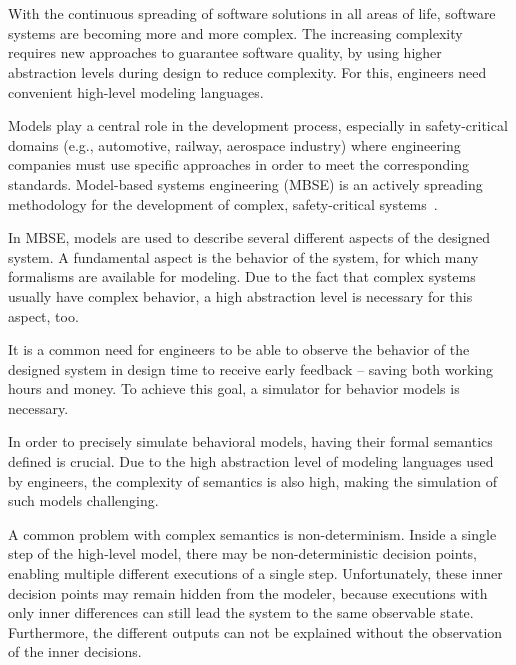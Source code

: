\chapter{\bevezetes}

With the continuous spreading of software solutions in all areas of life, software systems are becoming more and more complex. The increasing complexity requires new approaches to guarantee software quality, by using higher abstraction levels during design to reduce complexity. For this, engineers need convenient high-level modeling languages.

Models play a central role in the development process, especially in safety-critical domains (e.g., automotive, railway, aerospace industry) where engineering companies must use specific approaches in order to meet the corresponding standards. Model-based systems engineering (MBSE) is an actively spreading methodology for the development of complex, safety-critical systems~\cite{se2035}.

In MBSE, models are used to describe several different aspects of the designed system. A fundamental aspect is the behavior of the system, for which many formalisms are available for modeling. Due to the fact that complex systems usually have complex behavior, a high abstraction level is necessary for this aspect, too.

It is a common need for engineers to be able to observe the behavior of the designed system in design time to receive early feedback -- saving both working hours and money. To achieve this goal, a simulator for behavior models is necessary.

In order to precisely simulate behavioral models, having their formal semantics defined is crucial. Due to the high abstraction level of modeling languages used by engineers, the complexity of semantics is also high, making the simulation of such models challenging.

A common problem with complex semantics is non-determinism. Inside a single step of the high-level model, there may be non-deterministic decision points, enabling multiple different executions of a single step. Unfortunately, these inner decision points may remain hidden from the modeler, because executions with only inner differences can still lead the system to the same observable state. Furthermore, the different outputs can not be explained without the observation of the inner decisions.

